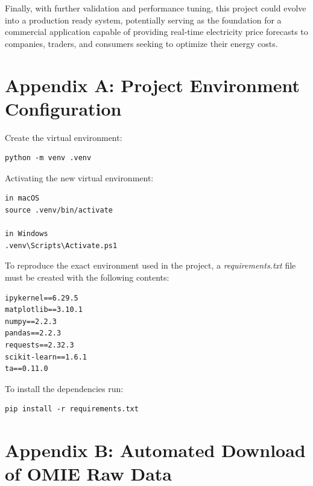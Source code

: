 \documentclass[12pt]{report} %
\begin{document}
Finally, with further validation and performance tuning, this project could evolve into a production ready system, potentially serving as the foundation for a commercial application capable of providing real-time electricity price forecasts to companies, traders, and consumers seeking to optimize their energy costs.



\clearpage
{}

\printbibliography



\appendix



\chapter* {Appendix A: Project Environment Configuration}
\label{app:appendix_a_env_setup}

\noindent Create the virtual environment:
\begin{verbatim}
python -m venv .venv
\end{verbatim}

\noindent Activating the new virtual environment:
\begin{verbatim}
in macOS
source .venv/bin/activate

in Windows
.venv\Scripts\Activate.ps1
\end{verbatim}

\noindent To reproduce the exact environment used in the project, a \textit{requirements.txt} file must be created with the following contents:
\begin{verbatim}
ipykernel==6.29.5
matplotlib==3.10.1
numpy==2.2.3
pandas==2.2.3
requests==2.32.3
scikit-learn==1.6.1
ta==0.11.0
\end{verbatim}

\noindent To install the dependencies run:
\begin{verbatim}
pip install -r requirements.txt 
\end{verbatim}



\chapter* {Appendix B: Automated Download of OMIE Raw Data}
\label{app:appendix_b_data_scrapping}
\end{document}
